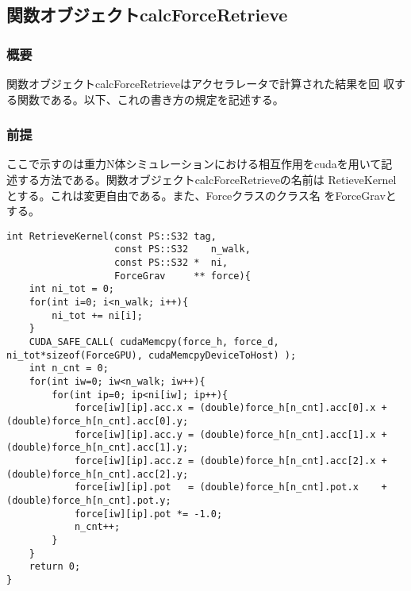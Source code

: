 \subsection{関数オブジェクトcalcForceRetrieve}
\label{sec:example_userdefined_calcForceRetrieve}

\subsubsection{概要}

関数オブジェクトcalcForceRetrieveはアクセラレータで計算された結果を回
収する関数である。以下、これの書き方の規定を記述する。

\subsubsection{前提}

ここで示すのは重力N体シミュレーションにおける相互作用をcudaを用いて記
述する方法である。関数オブジェクトcalcForceRetrieveの名前は
RetieveKernelとする。これは変更自由である。また、Forceクラスのクラス名
をForceGravとする。

\begin{lstlisting}[caption=calcForceRetrieve]
int RetrieveKernel(const PS::S32 tag,
                   const PS::S32    n_walk,
                   const PS::S32 *  ni,
                   ForceGrav     ** force){
    int ni_tot = 0;
    for(int i=0; i<n_walk; i++){
        ni_tot += ni[i];
    }
    CUDA_SAFE_CALL( cudaMemcpy(force_h, force_d,      ni_tot*sizeof(ForceGPU), cudaMemcpyDeviceToHost) );
    int n_cnt = 0;
    for(int iw=0; iw<n_walk; iw++){
        for(int ip=0; ip<ni[iw]; ip++){
            force[iw][ip].acc.x = (double)force_h[n_cnt].acc[0].x + (double)force_h[n_cnt].acc[0].y;
            force[iw][ip].acc.y = (double)force_h[n_cnt].acc[1].x + (double)force_h[n_cnt].acc[1].y;
            force[iw][ip].acc.z = (double)force_h[n_cnt].acc[2].x + (double)force_h[n_cnt].acc[2].y;
            force[iw][ip].pot   = (double)force_h[n_cnt].pot.x    + (double)force_h[n_cnt].pot.y;
            force[iw][ip].pot *= -1.0;
            n_cnt++;
        }
    }
    return 0;
}

\end{lstlisting}

